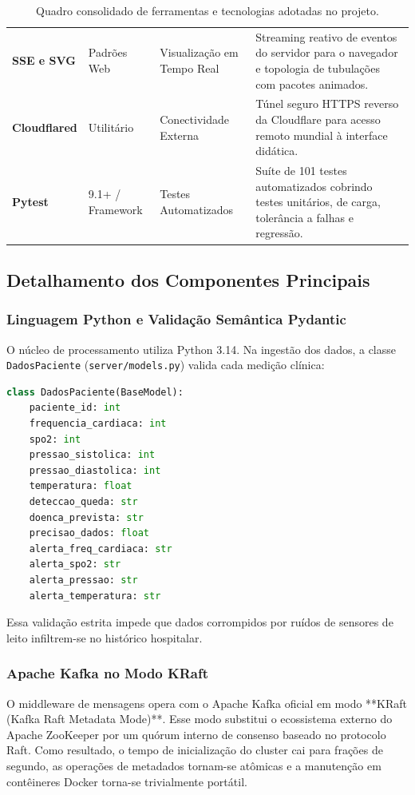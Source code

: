 \documentclass[12pt,a4paper]{article}
\begin{document}
\begin{table}[H]
\begin{tabularx}{\textwidth}{p{3.2cm} p{2.4cm} p{3.2cm} X}
		\textbf{SSE e SVG} & Padrões Web & Visualização em Tempo Real & Streaming reativo de eventos do servidor para o navegador e topologia de tubulações com pacotes animados. \\
		\textbf{Cloudflared} & Utilitário & Conectividade Externa & Túnel seguro HTTPS reverso da Cloudflare para acesso remoto mundial à interface didática. \\
		\textbf{Pytest} & 9.1+ / Framework & Testes Automatizados & Suíte de 101 testes automatizados cobrindo testes unitários, de carga, tolerância a falhas e regressão. \\
		\bottomrule
	\end{tabularx}
	\caption{Quadro consolidado de ferramentas e tecnologias adotadas no projeto.}
	\label{tab:ferramentas}
\end{table}

\subsection{Detalhamento dos Componentes Principais}

\subsubsection{Linguagem Python e Validação Semântica Pydantic}
O núcleo de processamento utiliza Python 3.14. Na ingestão dos dados, a classe \texttt{DadosPaciente} (\texttt{server/models.py}) valida cada medição clínica:
\begin{lstlisting}[language=Python]
class DadosPaciente(BaseModel):
    paciente_id: int
    frequencia_cardiaca: int
    spo2: int
    pressao_sistolica: int
    pressao_diastolica: int
    temperatura: float
    deteccao_queda: str
    doenca_prevista: str
    precisao_dados: float
    alerta_freq_cardiaca: str
    alerta_spo2: str
    alerta_pressao: str
    alerta_temperatura: str
\end{lstlisting}
Essa validação estrita impede que dados corrompidos por ruídos de sensores de leito infiltrem-se no histórico hospitalar.

\subsubsection{Apache Kafka no Modo KRaft}
O middleware de mensagens opera com o Apache Kafka oficial em modo **KRaft (Kafka Raft Metadata Mode)**. Esse modo substitui o ecossistema externo do Apache ZooKeeper por um quórum interno de consenso baseado no protocolo Raft. Como resultado, o tempo de inicialização do cluster cai para frações de segundo, as operações de metadados tornam-se atômicas e a manutenção em contêineres Docker torna-se trivialmente portátil.
\end{document}
